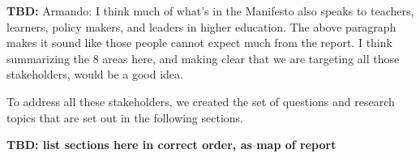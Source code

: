 \textbf{TBD:}  Armando: I think much of what's in the Manifesto also speaks to
teachers, learners, policy makers, and leaders in higher education.  The
above paragraph makes it sound like those people cannot expect much from
the report.  I think summarizing the 8 areas here, and making clear that
we are targeting all those stakeholders, would be a good idea.

To address all these stakeholders, we created the set of questions and
research topics that are set out in the following sections.

\textbf{TBD: list sections here in correct order, as map of report}
